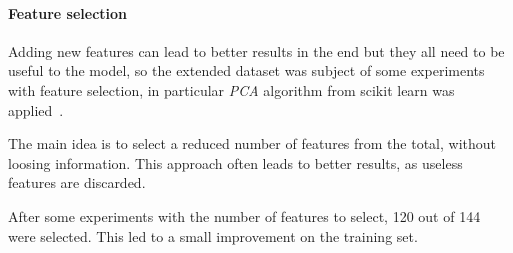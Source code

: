 \paragraph{Feature selection}
Adding new features can lead to better results 
in the end but they all need to be useful to the model, so 
the extended dataset was subject of some experiments with feature selection, 
in particular \emph{PCA} algorithm from scikit learn was applied~\cite{pca}.

The main idea is to select a reduced number of features from the total, 
without loosing information. This approach often leads to better results, 
as useless features are discarded.

After some experiments with the number of features to select, 120 out of 144
 were selected. This led to a small improvement on the training set.

\newpage